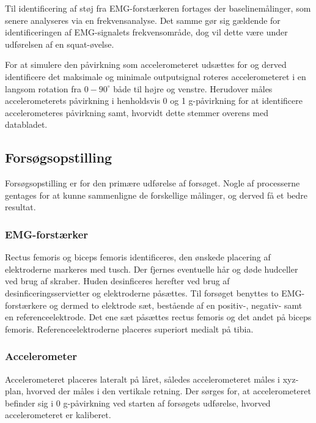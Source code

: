 Til identificering af støj fra EMG-forstærkeren fortages der baselinemålinger, som senere analyseres via en frekvensanalyse. Det samme gør sig gældende for identificeringen af EMG-signalets frekvensområde, dog vil dette være under udførelsen af en squat-øvelse.  


For at simulere den påvirkning som accelerometeret udsættes for og derved identificere det maksimale og minimale outputsignal roteres accelerometeret i en langsom rotation fra $0 - 90^{\circ}$ både til højre og venstre. Herudover måles accelerometerets påvirkning i henholdsvis 0 og 1 g-påvirkning for at identificere accelerometeres påvirkning samt, hvorvidt dette stemmer overens med databladet. 

\subsection{Forsøgsopstilling}
Forsøgsopstilling er for den primære udførelse af forsøget. Nogle af processerne gentages for at kunne sammenligne de forskellige målinger, og derved få et bedre resultat.

\subsubsection{EMG-forstærker}
Rectus femoris og biceps femoris identificeres, den ønskede placering af elektroderne markeres med tusch. Der fjernes eventuelle hår og døde hudceller ved brug af skraber. Huden desinficeres herefter ved brug af desinficeringsservietter og elektroderne påsættes. 
Til forsøget benyttes to EMG-forstærkere og dermed to elektrode sæt, bestående af en positiv-, negativ- samt en referenceelektrode. Det ene sæt påsættes rectus femoris og det andet på biceps femoris. Referenceelektroderne placeres superiort medialt på tibia. 


\subsubsection{Accelerometer}
Accelerometeret placeres lateralt på låret, således accelerometeret måles i xyz-plan, hvorved der måles i den vertikale retning. Der sørges for, at accelerometeret befinder sig i 0 g-påvirkning ved starten af forsøgets udførelse, hvorved accelerometeret er kaliberet. 

